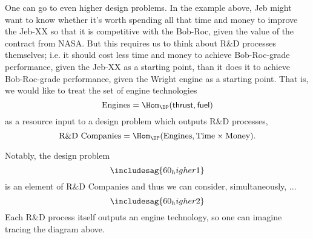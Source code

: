 One can go to even higher design problems. In the example above, Jeb might want to know whether it's worth spending all that time and money to improve the Jeb-XX so that it is competitive with the Bob-Roc, given the value of the contract from NASA. But this requires us to think about R\&D processes themselves; i.e. it should cost less time and money to achieve Bob-Roc-grade performance, given the Jeb-XX as a starting point, than it does it to achieve Bob-Roc-grade performance, given the Wright engine as a starting point. That is, we would like to treat the set of engine technologies
\[\text{Engines} = \Hom_\DP(\mathsf{thrust}, \mathsf{fuel})\]
as a resource input to a design problem which outputs R\&D processes,
\[\text{R\&D Companies} = \Hom_\DP(\text{Engines}, \text{Time} \times \text{Money}).\]

Notably, the design problem
\[
    \includesag{60_higher1}
\]
is an element of $\text{R\&D Companies}$ and thus we can consider, simultaneously, ...
\[
    \includesag{60_higher2}
\]
Each R\&D process itself outputs an engine technology, so one can imagine tracing the diagram above.
